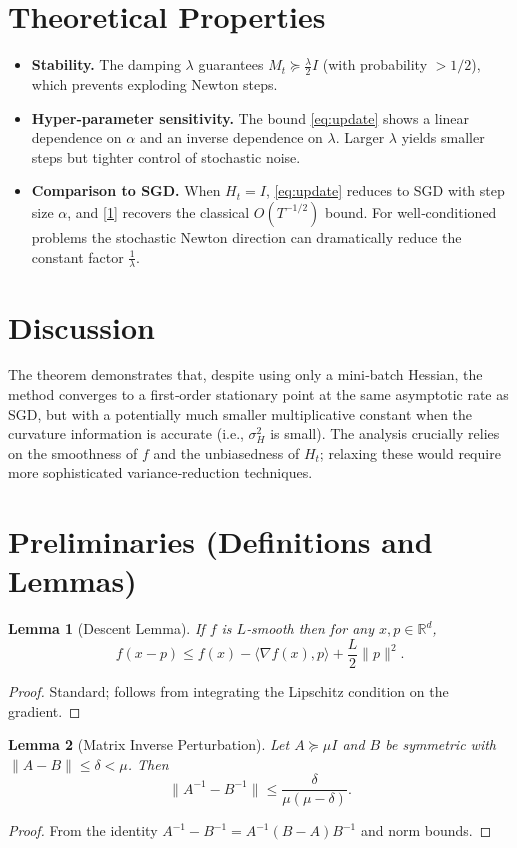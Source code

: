 \documentclass{article}
\newtheorem{lemma}{Lemma}
\newcommand{\R}{\mathbb{R}}
\begin{document}
\section*{Theoretical Properties}
\begin{itemize}[leftmargin=*]
\item \textbf{Stability.} The damping $\lambda$ guarantees $M_{t}\succeq \frac{\lambda}{2}I$ (with probability $>1/2$), which prevents exploding Newton steps.
\item \textbf{Hyper‑parameter sensitivity.} The bound \eqref{eq:update} shows a linear dependence on $\alpha$ and an inverse dependence on $\lambda$. Larger $\lambda$ yields smaller steps but tighter control of stochastic noise.
\item \textbf{Comparison to SGD.} When $H_{t}=I$, \eqref{eq:update} reduces to SGD with step size $\alpha$, and \eqref{1} recovers the classical $O(T^{-1/2})$ bound. For well‑conditioned problems the stochastic Newton direction can dramatically reduce the constant factor $\frac{1}{\lambda}$.
\end{itemize}

\section*{Discussion}
The theorem demonstrates that, despite using only a mini‑batch Hessian, the method converges to a first‑order stationary point at the same asymptotic rate as SGD, but with a potentially much smaller multiplicative constant when the curvature information is accurate (i.e., $\sigma_{H}^{2}$ is small). The analysis crucially relies on the smoothness of $f$ and the unbiasedness of $H_{t}$; relaxing these would require more sophisticated variance‑reduction techniques.

\section*{Preliminaries (Definitions and Lemmas)}
\begin{lemma}[Descent Lemma]\label{lem:descent}
If $f$ is $L$‑smooth then for any $x,p\in\R^{d}$,
\[
f(x-p)\le f(x)-\langle\nabla f(x),p\rangle+\frac{L}{2}\|p\|^{2}.
\]
\end{lemma}
\begin{proof}
Standard; follows from integrating the Lipschitz condition on the gradient. \qedhere
\end{proof}
\begin{lemma}[Matrix Inverse Perturbation]\label{lem:inv}
Let $A\succeq \mu I$ and $B$ be symmetric with $\|A-B\|\le\delta<\mu$. Then
\[
\|A^{-1}-B^{-1}\|\le\frac{\delta}{\mu(\mu-\delta)}.
\]
\end{lemma}
\begin{proof}
From the identity $A^{-1}-B^{-1}=A^{-1}(B-A)B^{-1}$ and norm bounds. \qedhere
\end{proof}
\end{document}

